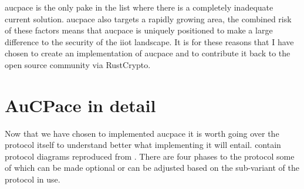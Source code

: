 \gls{aucpace} is the only \gls{pake} in the list where there is a completely inadequate current solution.
\gls{aucpace} also targets a rapidly growing area, the combined risk of these factors means that \gls{aucpace} is uniquely positioned to make a large difference to the security of the \gls{iiot} landscape.
It is for these reasons that I have chosen to create an implementation of \gls{aucpace} and to contribute it back to the open source community via RustCrypto.

\section{AuCPace in detail}
Now that we have chosen to implemented \gls{aucpace} it is worth going over the protocol itself to understand better what implementing it will entail.
 contain protocol diagrams reproduced from \cite{aucpace}.
There are four phases to the protocol some of which can be made optional or can be adjusted based on the sub-variant of the protocol in use.

